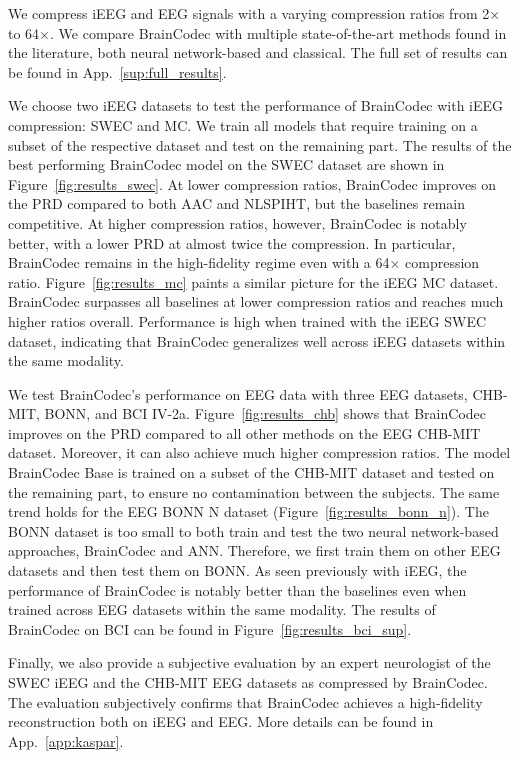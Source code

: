 \documentclass{article} %
\begin{document}
We compress iEEG and EEG signals with a varying compression ratios from 2$\times$ to 64$\times$. We compare BrainCodec with multiple state-of-the-art methods found in the literature, both neural network-based and classical. The full set of results can be found in App.~\ref{sup:full_results}. 

We choose two iEEG datasets to test the performance of BrainCodec with iEEG compression: SWEC and MC. We train all models that require training on a subset of the respective dataset and test on the remaining part. The results of the best performing BrainCodec model on the SWEC dataset are shown in Figure~\ref{fig:results_swec}. At lower compression ratios, BrainCodec improves on the PRD compared to both AAC and NLSPIHT, but the baselines remain competitive. At higher compression ratios, however, BrainCodec is notably better, with a lower PRD at almost twice the compression. In particular, BrainCodec remains in the high-fidelity regime even with a 64$\times$ compression ratio. Figure~\ref{fig:results_mc} paints a similar picture for the iEEG MC dataset. BrainCodec surpasses all baselines at lower compression ratios and reaches much higher ratios overall. Performance is high when trained with the iEEG SWEC dataset, indicating that BrainCodec generalizes well across iEEG datasets within the same modality.

We test BrainCodec's performance on EEG data with three EEG datasets, CHB-MIT, BONN, and BCI IV-2a. Figure~\ref{fig:results_chb} shows that BrainCodec improves on the PRD compared to all other methods on the EEG CHB-MIT dataset. Moreover, it can also achieve much higher compression ratios. The model BrainCodec Base is trained on a subset of the CHB-MIT dataset and tested on the remaining part, to ensure no contamination between the subjects.  The same trend holds for the EEG BONN N dataset (Figure~\ref{fig:results_bonn_n}). The BONN dataset is too small to both train and test the two neural network-based approaches, BrainCodec and ANN. Therefore, we first train them on other EEG datasets and then test them on BONN. As seen previously with iEEG, the performance of BrainCodec is notably better than the baselines even when trained across EEG datasets within the same modality. The results of BrainCodec on BCI can be found in Figure~\ref{fig:results_bci_sup}.

Finally, we also provide a subjective evaluation by an expert neurologist of the SWEC iEEG and the CHB-MIT EEG datasets as compressed by BrainCodec. The evaluation subjectively confirms that BrainCodec achieves a high-fidelity reconstruction both on iEEG and EEG. More details can be found in App.~\ref{app:kaspar}.
\end{document}
